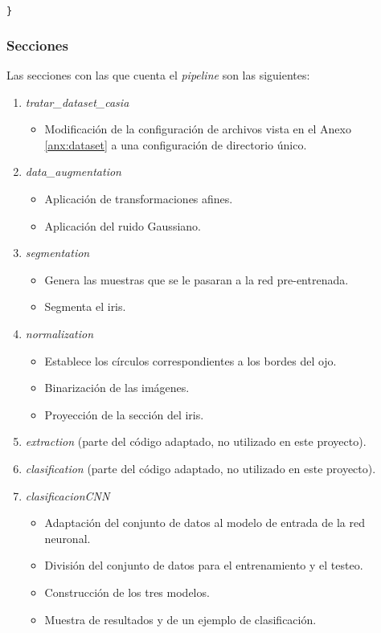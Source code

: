 {\begin{lstlisting}[language=Python]
}
\end{lstlisting}

\subsubsection{Secciones}

Las secciones con las que cuenta el \textit{pipeline} son las siguientes:

\begin{enumerate}
    \item \textit{tratar\_dataset\_casia}
    \begin{itemize}
        \item Modificación de la configuración de archivos vista en el Anexo \ref{anx:dataset} a una configuración de directorio único.
    \end{itemize}
    \item \textit{data\_augmentation}
    \begin{itemize}
        \item Aplicación de transformaciones afines.
        \item Aplicación del ruido Gaussiano.
    \end{itemize}
    \item \textit{segmentation}
    \begin{itemize}
        \item Genera las muestras que se le pasaran a la red pre-entrenada.
        \item Segmenta el iris.
    \end{itemize}
    \item \textit{normalization}
    \begin{itemize}
        \item Establece los círculos correspondientes a los bordes del ojo.
        \item Binarización de las imágenes.
        \item Proyección de la sección del iris.
    \end{itemize}
    \item \textit{extraction} (parte del código adaptado, no utilizado en este proyecto).
    \item \textit{clasification} (parte del código adaptado, no utilizado en este proyecto).
    \item \textit{clasificacionCNN}
    \begin{itemize}
        \item Adaptación del conjunto de datos al modelo de entrada de la red neuronal.
        \item División del conjunto de datos para el entrenamiento y el testeo.
        \item Construcción de los tres modelos.
        \item Muestra de resultados y de un ejemplo de clasificación.
    \end{itemize}
\end{enumerate}


}
